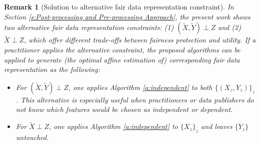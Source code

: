 \documentclass[twoside,11pt]{article}
\newtheorem{rema}{Remark}[section]{\bfseries}{\itshape}
\newtheorem{coro}{Corollary}[section]{\bfseries}{\itshape}
\begin{document}
\begin{rema}[Solution to alternative fair data representation constraint] \label{r:Solution to Alternative Fair Data Representation Constraint}
In Section \ref{s:Post-processing and Pre-processing Approach}, the present work shows two alternative fair data representation constraints: (1) $(\tilde{X},\tilde{Y}) \perp Z$ and (2) $\tilde{X} \perp Z$, which offer different trade-offs between fairness protection and utility. If a practitioner applies the alternative constraint, the proposed algorithms can be applied to generate (the optimal affine estimation of) corresponding fair data representation as the following:
\begin{itemize}
\item[1] For $(\tilde{X},\tilde{Y}) \perp Z$, one applies Algorithm \ref{a:independent} to both $\{(X_z, Y_z)\}_z$. This alternative is especially useful when practitioners or data publishers do not know which features would be chosen as independent or dependent.
\item[2] For $\tilde{X} \perp Z$, one applies Algorithm \ref{a:independent} to $\{X_z\}_z$ and leaves $\{Y_z\}$ untouched.
\end{itemize}
\end{rema}


\end{document}

